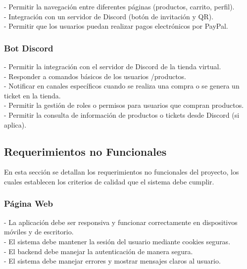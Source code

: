 \documentclass[a4paper,12pt]{article}
\begin{document}
- Permitir la navegación entre diferentes páginas (productos, carrito, perfil).\\

- Integración con un servidor de Discord (botón de invitación y QR).\\

- Permitir que los usuarios puedan realizar pagos electrónicos por PayPal.\\

\subsubsection{Bot Discord}
- Permitir la integración con el servidor de Discord de la tienda virtual.\\

- Responder a comandos básicos de los usuarios /productos.\\

- Notificar en canales específicos cuando se realiza una compra o se genera un ticket en la tienda.\\

- Permitir la gestión de roles o permisos para usuarios que compran productos.\\

- Permitir la consulta de información de productos o tickets desde Discord (si aplica).\\
\newpage
\subsection{Requerimientos no Funcionales}
En esta sección se detallan los requerimientos no funcionales del proyecto, los cuales establecen los criterios de calidad que el sistema debe cumplir.
\subsubsection{Página Web}

- La aplicación debe ser responsiva y funcionar correctamente en dispositivos móviles y de escritorio.\\

- El sistema debe mantener la sesión del usuario mediante cookies seguras.\\

- El backend debe manejar la autenticación de manera segura.\\

- El sistema debe manejar errores y mostrar mensajes claros al usuario.\\
\end{document}
